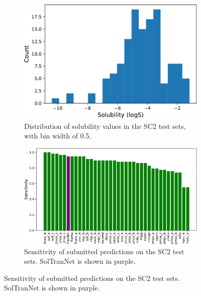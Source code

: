 \documentclass[journal=jmcmar,manuscript=article]{achemso}
\begin{document}
\begin{figure}[tb]
    \centering
    \begin{subfigure}[t]{0.4\textwidth}
        \centering
        \includegraphics[width=\linewidth]{figures/histogram_solchal2_true_logs.pdf}
        \caption{Distribution of solubility values in the SC2 test sets, with bin width of 0.5.}
    \end{subfigure}%
    \hfill
    \begin{subfigure}[t]{0.48\textwidth}
        \centering
        \includegraphics[width=\linewidth]{figures/hit_-4_solchal2.pdf}
        \caption{Sensitivity of submitted predictions on the SC2 test sets. SolTranNet is shown in purple.}
    \end{subfigure}
    

\end{figure}
\end{document}
